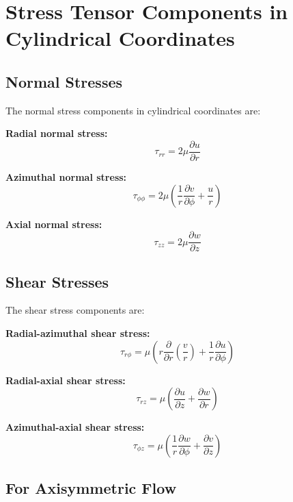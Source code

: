 \section{Stress Tensor Components in Cylindrical Coordinates}

\subsection{Normal Stresses}

The normal stress components in cylindrical coordinates are:

\textbf{Radial normal stress:}
\begin{equation}
    \tau_{rr} = 2\mu \frac{\partial u}{\partial r}
\end{equation}

\textbf{Azimuthal normal stress:}
\begin{equation}
    \tau_{\phi\phi} = 2\mu \left(\frac{1}{r}\frac{\partial v}{\partial \phi} + \frac{u}{r}\right)
\end{equation}

\textbf{Axial normal stress:}
\begin{equation}
    \tau_{zz} = 2\mu \frac{\partial w}{\partial z}
\end{equation}

\subsection{Shear Stresses}

The shear stress components are:

\textbf{Radial-azimuthal shear stress:}
\begin{equation}
    \tau_{r\phi} = \mu \left( r\frac{\partial}{\partial r}\left(\frac{v}{r}\right) + \frac{1}{r}\frac{\partial u}{\partial \phi}\right)
\end{equation}

\textbf{Radial-axial shear stress:}
\begin{equation}
    \tau_{rz} = \mu \left(\frac{\partial u}{\partial z} + \frac{\partial w}{\partial r}\right)
\end{equation}

\textbf{Azimuthal-axial shear stress:}
\begin{equation}
    \tau_{\phi z} = \mu \left(\frac{1}{r}\frac{\partial w}{\partial \phi} + \frac{\partial v}{\partial z}\right)
\end{equation}

\subsection{For Axisymmetric Flow}

